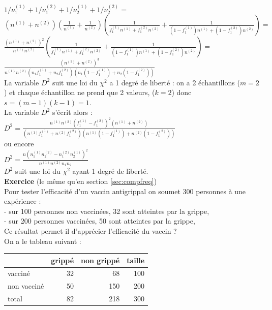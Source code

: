 \documentclass[a4paper,11pt]{book}
\begin{document}
$1/\nu_1^{(1)}+1/\nu_1^{(2)}+1/\nu_2^{(1)}+1/\nu_2^{(2)}=$\\
$\displaystyle (n^{(1)}+n^{(2)})(\frac{1}{n^{(1)}}+\frac{1}{n^{(2)}})(\frac{1}{f_1^{(1)}n^{(1)}+f_1^{(2)}n^{(2)}}+\frac{1}{(1-f_1^{(1)})n^{(1)}+(1-f_1^{(2)})n^{(2)}})=$\\
$\displaystyle \frac{(n^{(1)}+n^{(2)})^2}{n^{(1)}n^{(2)}}(\frac{1}{f_1^{(1)}n^{(1)}+f_1^{(2)}n^{(2)}}+\frac{1}{(1-f_1^{(1)})n^{(1)}+(1-f_1^{(2)})n^{(2)}})=$\\
$\displaystyle\frac{(n^{(1)}+n^{(2)})^3}{n^{(1)}n^{(2)}(n_1f_1^{(1)}+n_2f_1^{(2)})(n_1(1-f_1^{(1)})+n_2(1-f_1^{(2)}))}$\\
La variable $D^2$ suit une loi du $\chi^2$ a 1 degr\'e de libert\'e : on 
a 2 \'echantillons  ($m=2$) et chaque \'echantillon ne prend que 2 valeurs,
 ($k=2$) donc $s=(m-1)(k-1)=1$.\\
 La variable $D^2$ s'\'ecrit alors :\\
$\displaystyle D^2=\frac{n^{(1)}n^{(2)}(f_1^{(1)}-f_1^{(2)})^2(n^{(1)}+n^{(2)})}{(n^{(1)}f_1^{(1)}+n^{(2)}f_1^{(2)})(n^{(1)}(1-f_1^{(1)})+n^{(2)}(1-f_1^{(2)}))}$ \\
 ou encore \\
$\displaystyle D^2=\frac{n(n_1^{(1)}n_2^{(2)}-n_1^{(2)}n_2^{(1)})^2}{n^{(1)}n^{(2)}n_1n_2}$\\
$D^2$ suit une loi du $\chi^2$ ayant 1 degr\'e de libert\'e.\\
{\bf Exercice} (le m\^eme qu'en section \ref{sec:compfreq})\\
Pour tester l'efficacit\'e d'un vaccin antigrippal on soumet 300 personnes 
\`a une exp\'erience : \\
- sur 100 personnes non vaccin\'ees, 32 sont atteintes par la grippe,\\
- sur 200 personnes  vaccin\'ees, 50 sont atteintes par la grippe,\\  
Ce r\'esultat permet-il d'appr\'ecier l'efficacit\'e du vaccin ?\\
On a le tableau suivant :\\

\begin{tabular}{|l|r|r|r|}
\hline
 &gripp\'e&non gripp\'e&taille\\
\hline
vaccin\'e&32&68&100\\
\hline
non vaccin\'e& 50&150&200\\
\hline
total&82&218&300\\
\hline
\end{tabular}\\
\end{document}
